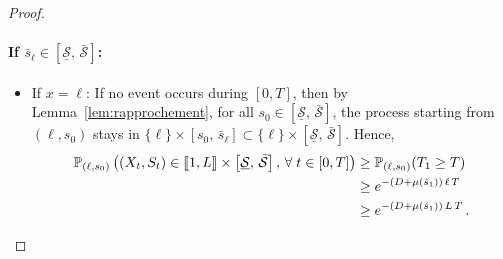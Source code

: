 \documentclass[AHL,Unicode,longabstracts,published]{cedram}
\newcommand{\llbracket}{\mathopen{[\mkern -2.7mu[}}
\newcommand{\rrbracket}{\mathclose{]\mkern -2.7mu]}}
\newcommand{\PP}{\mathbb{P}}
\newcommand{\Smin}{\underline{\mathcal{S}}}
\newcommand{\Smax}{\bar{\mathcal{S}}}
\newcommand{\barmu}{\mu(\bar s_1)}
\newcommand{\setunL}{\llbracket 1, L\rrbracket}
\newcommand{\1}{\mathbf{1}}
\let\oldforall\forall
\renewcommand*{\forall}{\mathrel{\oldforall}}
\begin{document}
\begin{proof}
\paragraph{If $\bar s_\ell \in [\Smin, \, \Smax]$:}
\begin{itemize}
\item If $x=\ell$: If no event occurs during $[0,T]$, then by Lemma~\ref{lem:rapprochement}, for all $s_0 \in [\Smin, \, \Smax]$, the process starting from $(\ell, s_0)$ stays in $\{\ell\}\times [s_0, \, \bar s_\ell]\subset \{\ell\}\times [\Smin, \, \Smax]$. Hence,
\begin{equation}\label{eq.stayinS.noevent}
\begin{split}
\PP_{(\ell,s_0)}
\left(\left(X_t,S_t\right) \in \setunL\times \left[\Smin, \, \Smax\right], \,
\forall t\in[0,T]\right) &\geq \PP_{(\ell,s_0)}(T_1 \geq T)
\\
&\geq e^{-(D+\barmu)\,\ell\,T}
\\
&\geq e^{-(D+\barmu)\,L\,T}\,.
\end{split}
\end{equation}


\end{itemize}
\end{proof}
\end{document}
